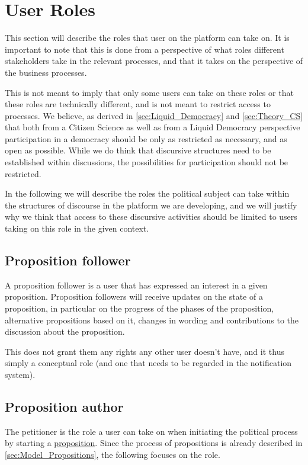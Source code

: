 \section{User Roles}
\label{sec:UserRoles}
This section will describe the roles that user on the platform can take on.
It is important to note that this is done from a perspective of what roles different stakeholders take in the relevant processes, and that it takes on the perspective of the business processes.

This is not meant to imply that only some users can take on these roles or that these roles are technically different, and is not meant to restrict access to processes. We believe, as derived in \ref{sec:Liquid_Democracy} and \ref{sec:Theory_CS} that both from a Citizen Science as well as from a Liquid Democracy perspective participation in a democracy should be only as restricted as necessary, and as open as possible. While we do think that discursive structures need to be established within discussions, the possibilities for participation should not be restricted.

In the following we will describe the roles the political subject can take within the structures of discourse in the platform we are developing, and we will justify why we think that access to these discursive activities should be limited to users taking on this role in the given context.

\subsection{Proposition follower}
A proposition follower is a user that has expressed an interest in a given proposition. Proposition followers will receive updates on the state of a proposition, in particular on the progress of the phases of the proposition, alternative propositions based on it, changes in wording and contributions to the discussion about the proposition.

This does not grant them any rights any other user doesn't have, and it thus simply a conceptual role (and one that needs to be regarded in the notification system).

\subsection{Proposition author}
\label{ssec:Roles_Petitioner}
The petitioner is the role a user can take on when initiating the political process by starting a \href{ssec:Model_Propositions}{proposition}. Since the process of propositions is already described in \ref{sec:Model_Propositions}, the following focuses on the role.

